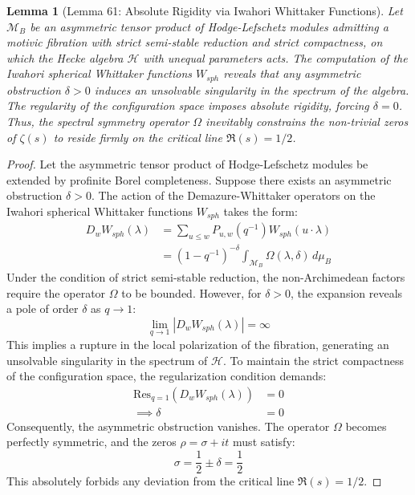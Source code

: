 \documentclass[
]{article}
\newtheorem{lemma}{Lemma}
\begin{document}
\begin{lemma}[Lemma 61: Absolute Rigidity via Iwahori Whittaker Functions]\label{lemma:61_en}
Let $\mathcal{M}_{B}$ be an asymmetric tensor product of Hodge-Lefschetz modules admitting a motivic fibration with strict semi-stable reduction and strict compactness, on which the Hecke algebra $\mathcal{H}$ with unequal parameters acts. The computation of the Iwahori spherical Whittaker functions $W_{sph}$ reveals that any asymmetric obstruction $\delta > 0$ induces an unsolvable singularity in the spectrum of the algebra. The regularity of the configuration space imposes absolute rigidity, forcing $\delta = 0$. Thus, the spectral symmetry operator $\Omega$ inevitably constrains the non-trivial zeros of $\zeta(s)$ to reside firmly on the critical line $\Re(s) = 1/2$.
\end{lemma}
\begin{proof}
Let the asymmetric tensor product of Hodge-Lefschetz modules be extended by profinite Borel completeness. Suppose there exists an asymmetric obstruction $\delta > 0$. The action of the Demazure-Whittaker operators on the Iwahori spherical Whittaker functions $W_{sph}$ takes the form:
\begin{align*}
    D_w W_{sph}(\lambda) &= \sum_{u \le w} P_{u,w}(q^{-1}) W_{sph}(u \cdot \lambda) \\
    &= \left( 1 - q^{-1} \right)^{-\delta} \int_{\mathcal{M}_{B}} \Omega(\lambda, \delta) \, d\mu_B
\end{align*}
Under the condition of strict semi-stable reduction, the non-Archimedean factors require the operator $\Omega$ to be bounded. However, for $\delta > 0$, the expansion reveals a pole of order $\delta$ as $q \to 1$:
\begin{equation*}
    \lim_{q \to 1} \left| D_w W_{sph}(\lambda) \right| = \infty
\end{equation*}
This implies a rupture in the local polarization of the fibration, generating an unsolvable singularity in the spectrum of $\mathcal{H}$. To maintain the strict compactness of the configuration space, the regularization condition demands:
\begin{align*}
    \text{Res}_{q=1} \left( D_w W_{sph}(\lambda) \right) &= 0 \\
    \implies \delta &= 0
\end{align*}
Consequently, the asymmetric obstruction vanishes. The operator $\Omega$ becomes perfectly symmetric, and the zeros $\rho = \sigma + it$ must satisfy:
\begin{equation*}
    \sigma = \frac{1}{2} \pm \delta = \frac{1}{2}
\end{equation*}
This absolutely forbids any deviation from the critical line $\Re(s) = 1/2$.
\end{proof}
\end{document}
